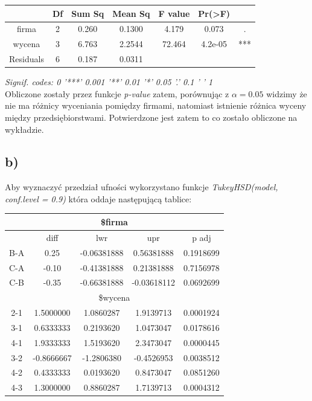 \documentclass{article}
\begin{document}
\begin{center} \begin{tabular}{|c|c|c|c|c|c|c|} \hline
& Df & Sum Sq & Mean Sq & F value & Pr(>F) & \\ \hline
firma & 2 & 0.260 & 0.1300 & 4.179 & 0.073 & . \\ \hline
wycena & 3 & 6.763 & 2.2544 & 72.464 & 4.2e-05 & *** \\ \hline
Residuals & 6 & 0.187 & 0.0311 & & & \\ \hline
\end{tabular} \end{center}

\textit{Signif. codes:  0 '***' 0.001 '**' 0.01 '*' 0.05 '.' 0.1 ' ' 1} \\
Obliczone zostały przez funkcje \textit{p-value} zatem, porównując z $\alpha=0.05$ widzimy że nie ma różnicy wyceniania pomiędzy firmami, natomiast istnienie różnica wyceny między przedsiębiorstwami. Potwierdzone jest zatem to co zostało obliczone na wykładzie.

\subsection{b)}
Aby wyznaczyć przedział ufności wykorzystano funkcje \textit{TukeyHSD(model, conf.level = 0.9)} która oddaje następującą tablice:
\begin{center} \begin{tabular}{|c|c|c|c|c|} \hline
\multicolumn{5}{|c|}{\$firma} \\ \hline
& diff & lwr & upr & p adj \\ \hline
B-A & 0.25 & -0.06381888 & 0.56381888 & 0.1918699 \\ \hline
C-A & -0.10 & -0.41381888 & 0.21381888 & 0.7156978 \\ \hline
C-B & -0.35 & -0.66381888 & -0.03618112 & 0.0692699 \\ \hline
\multicolumn{5}{|c|}{\$wycena} \\ \hline
2-1 & 1.5000000 & 1.0860287 & 1.9139713 & 0.0001924 \\ \hline
3-1 & 0.6333333 & 0.2193620 & 1.0473047 & 0.0178616 \\ \hline
4-1 & 1.9333333 & 1.5193620 & 2.3473047 & 0.0000445 \\ \hline
3-2 & -0.8666667 & -1.2806380 & -0.4526953 & 0.0038512 \\ \hline
4-2 & 0.4333333 & 0.0193620 & 0.8473047 & 0.0851260 \\ \hline
4-3 & 1.3000000 & 0.8860287 & 1.7139713 & 0.0004312 \\ \hline
\end{tabular} \end{center}
\end{document}
